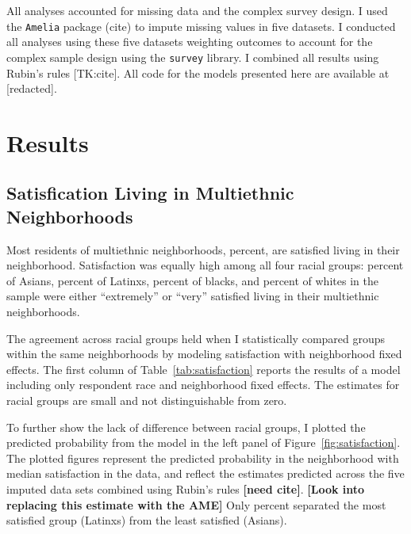 \documentclass{baderart}
\begin{document}
All analyses accounted for missing data and the complex survey design. I used the \texttt{Amelia} package (cite) to impute missing values in five datasets. I conducted all analyses using these five datasets weighting outcomes to account for the complex sample design using the \texttt{survey} library. I combined all results using Rubin's rules {[}TK:cite{]}. All code for the models presented here are available at {[}redacted{]}.

\section{Results}\label{results}

\subsection{Satisfication Living in Multiethnic Neighborhoods}\label{satisfication-living-in-multiethnic-neighborhoods}

Most residents of multiethnic neighborhoods, \meansatisfied percent, are satisfied living in their neighborhood. Satisfaction was equally high among all four racial groups: \apisatisfied percent of Asians, \hspsatisfied percent of Latinxs, \nhbsatisfied percent of blacks, and \nhwsatisfied percent of whites in the sample were either ``extremely'' or ``very'' satisfied living in their multiethnic neighborhoods.

The agreement across racial groups held when I statistically compared groups within the same neighborhoods by modeling satisfaction with neighborhood fixed effects. The first column of Table~\ref{tab:satisfaction} reports the results of a model including only respondent race and neighborhood fixed effects. The estimates for racial groups are small and not distinguishable from zero.



To further show the lack of difference between racial groups, I plotted the predicted probability from the model in the left panel of Figure~\ref{fig:satisfaction}. The plotted figures represent the predicted probability in the neighborhood with median satisfaction in the data, and reflect the estimates predicted across the five imputed data sets combined using Rubin's rules \textbf{{[}need cite{]}}. \textbf{{[}Look into replacing this estimate with the AME{]}} Only \maxdiffone percent separated the most satisfied group (Latinxs) from the least satisfied (Asians).

\end{document}
